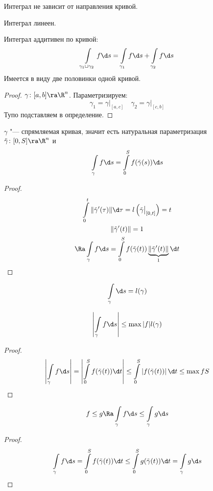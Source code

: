 \item
	Интеграл не зависит от направления кривой.

\item
	Интеграл линеен.

\item
	Интеграл аддитивен по кривой:
	\[ \int\limits_{\gamma_1 \sqcup \gamma_2} f \d s = \int\limits_{\gamma_1} f \d s + \int\limits_{\gamma_2} f \d s \]
	Имеется в виду две половинки одной кривой.
	\begin{proof}
		$\gamma\colon [a, b] \ra \R^n$.
		Параметризируем:
		\[ \gamma_1 = \gamma \bigr|_{[a, c]} \quad \gamma_2 = \gamma \bigr|_{[c, b]} \]
		Тупо подставляем в определение.
	\end{proof}

\item
	$\gamma$ "--- спрямляемая кривая, значит есть натуральная параметризация $\tilde \gamma\colon [0, S] \ra \R^n$ и
	\[ \int\limits_\gamma f \d s = \int\limits_0^S f(\tilde \gamma(s)) \d s \]
	\begin{proof}
		\begin{gather*}
			\int\limits_0^t \|\tilde\gamma'(\tau)\| \d \tau = l\left(\tilde \gamma \bigr|_{[0, t]}\right) = t \\
			\|\tilde\gamma'(t)\| = 1 \\
			\Ra \int\limits_\gamma f \d s = \int\limits_0^S f(\tilde\gamma(t)) \underbrace{\|\tilde\gamma'(t)\|}_1 \d t
		\end{gather*}
	\end{proof}

\item
	\[ \int\limits_\gamma \d s = l(\gamma) \]

\item
	\[ \left| \int\limits_\gamma f \d s \right| \le \max |f| l(\gamma) \]
	\begin{proof}
		\begin{gather*}
			\left| \int\limits_\gamma f \d s \right|
			= \left| \int\limits_0^S f(\tilde\gamma(t)) \d t \right|
			\le \int\limits_0^S \left| f(\tilde\gamma(t)) \right| \d t \le \max f S
		\end{gather*}
	\end{proof}

\item
	\[ f \le g \Ra \int\limits_\gamma f \d s \le \int\limits_\gamma g \d s \]
	\begin{proof}
		\[
			\int\limits_\gamma f \d s = \int\limits_0^S f(\tilde\gamma(t)) \d t
			\le \int\limits_0^S g(\tilde\gamma(t)) \d t = \int\limits_\gamma g \d s
		\]
	\end{proof}

